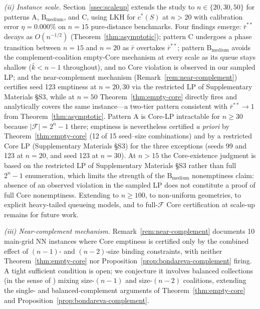 \documentclass[11pt]{article}
\theoremstyle{plain}
\theoremstyle{definition}
\theoremstyle{remark}
\newcommand{\F}{\mathcal{F}}
\begin{document}
\emph{(ii) Instance scale.} Section~\ref{ssec:scaleup} extends the study to $n\in\{20,30,50\}$ for patterns A, $\text{B}_{\text{medium}}$, and C, using LKH \citep{helsgaun2000effective} for $c^{\ast}(S)$ at $n>20$ with calibration error $\eta=0.000\%$ on $n=15$ pure-distance benchmarks. Four findings emerge: $\bar r^{\ast\ast}$ decays as $O(n^{-1/2})$ (Theorem~\ref{thm:asymptotic}); pattern C undergoes a phase transition between $n=15$ and $n=20$ as $\bar r$ overtakes $\bar r^{\ast\ast}$; pattern $\text{B}_{\text{medium}}$ avoids the complement-coalition empty-Core mechanism at every scale as its queue stays shallow ($\bar k<n-1$ throughout), and no Core violation is observed in our sampled LP; and the near-complement mechanism (Remark~\ref{rem:near-complement}) certifies seed 123 emptiness at $n=20,30$ via the restricted LP of Supplementary Materials \S S3, while at $n=50$ Theorem~\ref{thm:empty-core} directly fires and analytically covers the same instance---a two-tier pattern consistent with $\bar r^{\ast\ast}\to 1$ from Theorem~\ref{thm:asymptotic}. Pattern A is Core-LP intractable for $n\ge 30$ because $|\F| = 2^n - 1$ there; emptiness is nevertheless certified \emph{a priori} by Theorem~\ref{thm:empty-core} (12 of 15 seed--size combinations) and by a restricted Core LP (Supplementary Materials \S S3) for the three exceptions (seeds 99 and 123 at $n=20$, and seed 123 at $n=30$). At $n>15$ the Core-existence judgment is based on the restricted LP of Supplementary Materials \S S3 rather than full $2^n-1$ enumeration, which limits the strength of the $\text{B}_{\text{medium}}$ nonemptiness claim: absence of an observed violation in the sampled LP does not constitute a proof of full Core nonemptiness. Extending to $n\ge 100$, to non-uniform geometries, to explicit heavy-tailed queueing models, and to full-$\F$ Core certification at scale-up remains for future work.

\emph{(iii) Near-complement mechanism.} Remark~\ref{rem:near-complement} documents 10 main-grid NN instances where Core emptiness is certified only by the combined effect of $(n-1)$- and $(n-2)$-size binding constraints, with neither Theorem~\ref{thm:empty-core} nor Proposition~\ref{prop:bondareva-complement} firing. A tight sufficient condition is open; we conjecture it involves balanced collections (in the sense of \citealp{shapley1971core}) mixing size-$(n-1)$ and size-$(n-2)$ coalitions, extending the single- and balanced-complement arguments of Theorem~\ref{thm:empty-core} and Proposition~\ref{prop:bondareva-complement}.
\end{document}
